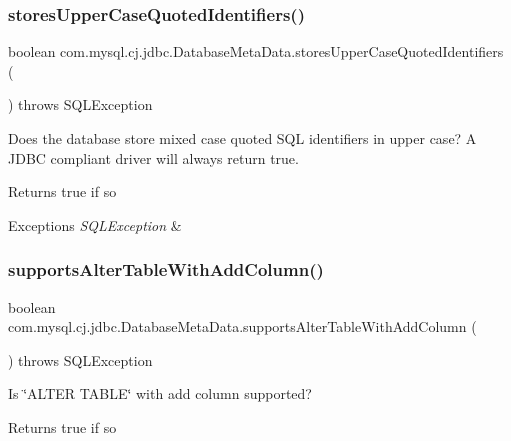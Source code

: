\subsubsection{\texorpdfstring{stores\+Upper\+Case\+Quoted\+Identifiers()}{storesUpperCaseQuotedIdentifiers()}}
{\footnotesize\ttfamily boolean com.\+mysql.\+cj.\+jdbc.\+Database\+Meta\+Data.\+stores\+Upper\+Case\+Quoted\+Identifiers (\begin{DoxyParamCaption}{ }\end{DoxyParamCaption}) throws S\+Q\+L\+Exception}

Does the database store mixed case quoted S\+QL identifiers in upper case? A J\+D\+BC compliant driver will always return true.

\begin{DoxyReturn}{Returns}
true if so 
\end{DoxyReturn}

\begin{DoxyExceptions}{Exceptions}
{\em S\+Q\+L\+Exception} & \\
\hline
\end{DoxyExceptions}
\mbox{\label{classcom_1_1mysql_1_1cj_1_1jdbc_1_1_database_meta_data_a94604413083173d8d191bd89e6383594}} 
\subsubsection{\texorpdfstring{supports\+Alter\+Table\+With\+Add\+Column()}{supportsAlterTableWithAddColumn()}}
{\footnotesize\ttfamily boolean com.\+mysql.\+cj.\+jdbc.\+Database\+Meta\+Data.\+supports\+Alter\+Table\+With\+Add\+Column (\begin{DoxyParamCaption}{ }\end{DoxyParamCaption}) throws S\+Q\+L\+Exception}

Is \char`\"{}\+A\+L\+T\+E\+R T\+A\+B\+L\+E\char`\"{} with add column supported?

\begin{DoxyReturn}{Returns}
true if so 
\end{DoxyReturn}

